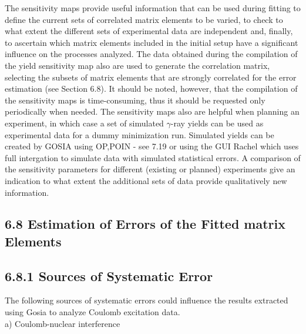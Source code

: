 \documentclass[10pt]{article}
\begin{document}
The sensitivity maps provide useful information that can be used during fitting to define the current sets of correlated matrix elements to be varied, to check to what extent the different sets of experimental data are independent and, finally, to ascertain which matrix elements included in the initial setup have a significant influence on the processes analyzed. The data obtained during the compilation of the yield sensitivity map also are used to generate the correlation matrix, selecting the subsets of matrix elements that are strongly correlated for the error estimation (see Section 6.8). It should be noted, however, that the compilation of the sensitivity maps is time-consuming, thus it should be requested only periodically when needed. The sensitivity maps also are helpful when planning an experiment, in which case a set of simulated $\gamma$-ray yields can be used as experimental data for a dummy minimization run. Simulated yields can be created by GOSIA using OP,POIN - see 7.19 or using the GUI Rachel which uses full intergation to simulate data with simulated statistical errors. A comparison of the sensitivity parameters for different (existing or planned) experiments give an indication to what extent the additional sets of data provide qualitatively new information.

\subsection*{6.8 Estimation of Errors of the Fitted matrix Elements}
\subsection*{6.8.1 Sources of Systematic Error}
The following sources of systematic errors could influence the results extracted using Gosia to analyze Coulomb excitation data.\\
a) Coulomb-nuclear interference
\end{document}
